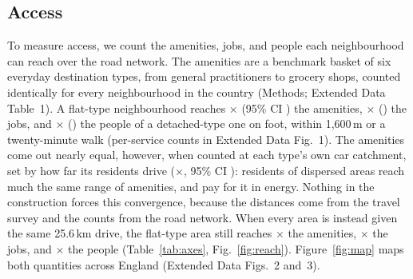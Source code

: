 \documentclass[pdflatex,sn-nature]{sn-jnl}
\begin{document}
\begin{table}[!htbp]
  \caption{Access and energy by dwelling type. The four type columns give the median of the areas whose dominant (most common) dwelling type is the one named. The dominant-type median column is the ratio of the flat and detached medians, taken flat over detached for access and detached over flat for energy. The pure-type ratio is the compositional estimate for the idealised single-type extremes, with the confounds held (Methods). The final column repeats each energy ratio with household size held equal as a control; access belongs to the location, so it has no equal-household-size variant. Medians are not additive, so the energy total row, the per-area median of home plus travel, need not equal the sum of the home and travel rows.}
  \label{tab:axes}
  \centering
  {\footnotesize\setlength{\tabcolsep}{3pt}
    \par\vspace{6pt}
  }
\end{table}

\subsection*{Access}

To measure access, we count the amenities, jobs, and people each neighbourhood can reach over the road network. The amenities are a benchmark basket of six everyday destination types, from general practitioners to grocery shops, counted identically for every neighbourhood in the country (Methods; Extended Data Table~1). A flat-type neighbourhood reaches \nepiwalkAmen$\times$ (95\% CI \nepiwalkAmenCI) the amenities, \nepiwalkJobs$\times$ (\nepiwalkJobsCI) the jobs, and \nepiwalkPeople$\times$ (\nepiwalkPeopleCI) the people of a detached-type one on foot, within 1,600\,m or a twenty-minute walk (per-service counts in Extended Data Fig.~1). The amenities come out nearly equal, however, when counted at each type's own car catchment, set by how far its residents drive (\nepicatchAmen$\times$, 95\% CI \nepicatchAmenCI): residents of dispersed areas reach much the same range of amenities, and pay for it in energy. Nothing in the construction forces this convergence, because the distances come from the travel survey and the counts from the road network. When every area is instead given the same 25.6\,km drive, the flat-type area still reaches \nepidriveAmen$\times$ the amenities, \nepidriveJobs$\times$ the jobs, and \nepidrivePeople$\times$ the people (Table~\ref{tab:axes}, Fig.~\ref{fig:reach}). Figure~\ref{fig:map} maps both quantities across England (Extended Data Figs.~2 and~3).
\end{document}
